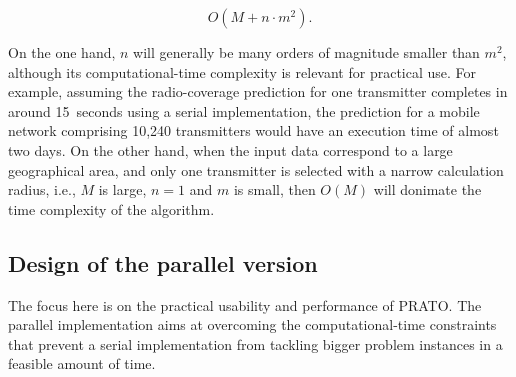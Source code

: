 \begin{equation}
O(M+n\cdot m^{2}).
\end{equation}


\noindent On the one hand, $n$ will generally be many orders of magnitude
smaller than $m^{2}$, although its computational-time complexity
is relevant for practical use. For example, assuming the radio-coverage
prediction for one transmitter completes in around 15~seconds using
a serial implementation, the prediction for a mobile network comprising
10,240 transmitters would have an execution time of almost two days.
On the other hand, when the input data correspond to a large geographical
area, and only one transmitter is selected with a narrow calculation
radius, i.e., $M$ is large, $n=1$ and $m$ is small, then $O(M)$
will donimate the time complexity of the algorithm.


\subsection{Design of the parallel version \label{sub:04-Design_of_the_parallel_version}}

The focus here is on the practical usability and performance of PRATO.
The parallel implementation aims at overcoming the computational-time
constraints that prevent a serial implementation from tackling bigger
problem instances in a feasible amount of time.

